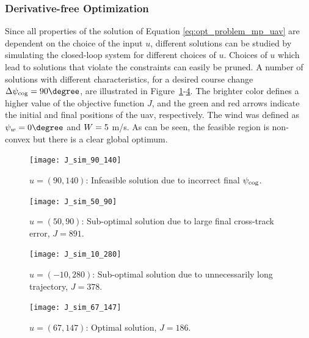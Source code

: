 \subsubsection{Derivative-free Optimization}
Since all properties of the solution of Equation \eqref{eq:opt_problem_mp_uav} are dependent on the choice of the input $u$, different solutions can be studied by simulating
the closed-loop system for different choices of $u$. Choices of $u$ which lead to solutions that violate the constraints 
can easily be pruned. A number of solutions with different characteristics, for a desired course change $\Delta\cog=90\degree$, are illustrated in Figure~\ref{fig:opt_contour_1}-\ref{fig:opt_contour_4}. 
The brighter color defines a higher value of the objective function $J$, and the green and red arrows indicate the initial and final positions of the \ac{uav}, respectively. The wind was defined as $\winddir=0\degree$ and $W=5$ m/s.
As can be seen, the feasible region is non-convex but there is a clear global optimum.

\begin{figure}[H]
    \centering
    \texttt{[image: J\_sim\_90\_140]}
    \caption{$u=(90,140)$: Infeasible solution due to incorrect final $\psi_{\text{cog}}$.}
    \label{fig:opt_contour_1}
\end{figure}

\begin{figure}[H]
    \centering
    \texttt{[image: J\_sim\_50\_90]}
    \caption{$u=(50,90)$: Sub-optimal solution due to large final cross-track error, $J=891$.}
    \label{fig:opt_contour_2}
\end{figure}

\begin{figure}[H]
    \centering
    \texttt{[image: J\_sim\_10\_280]}
    \caption{$u=(-10,280)$: Sub-optimal solution due to unnecessarily long trajectory, $J=378$.}
    \label{fig:opt_contour_3}
\end{figure}

\begin{figure}[H]
    \centering
    \texttt{[image: J\_sim\_67\_147]}
    \caption{$u=(67,147)$: Optimal solution, $J=186$.}
    \label{fig:opt_contour_4}
\end{figure}

